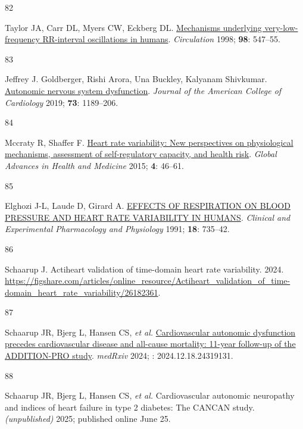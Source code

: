 \documentclass[
  letterpaper,
  headsepline=true,
  open=any]{scrbook}
\newlength{\cslhangindent}
\newlength{\csllabelwidth}
\newlength{\cslentryspacingunit} %
\newenvironment{CSLReferences}[2] %
 {%
  \setlength{\parindent}{0pt}
  \ifodd #1
  \let\oldpar\par
  \def\par{\hangindent=\cslhangindent\oldpar}
  \fi
  \setlength{\parskip}{#2\cslentryspacingunit}
 }%
 {}
\newcommand{\CSLLeftMargin}[1]{\parbox[t]{\csllabelwidth}{#1}}
\newcommand{\CSLRightInline}[1]{\parbox[t]{\linewidth - \csllabelwidth}{#1}\break}
\begin{document}
\begin{CSLReferences}{0}{0}
\leavevmode{}%
\CSLLeftMargin{82 }%
\CSLRightInline{Taylor JA, Carr DL, Myers CW, Eckberg DL.
\href{https://doi.org/10.1161/01.CIR.98.6.547}{Mechanisms underlying
very-low-frequency RR-interval oscillations in humans}.
\emph{Circulation} 1998; \textbf{98}: 547--55.}

\leavevmode{}%
\CSLLeftMargin{83 }%
\CSLRightInline{Jeffrey J. Goldberger, Rishi Arora, Una Buckley,
Kalyanam Shivkumar.
\href{https://doi.org/doi:10.1016/j.jacc.2018.12.064}{Autonomic nervous
system dysfunction}. \emph{Journal of the American College of
Cardiology} 2019; \textbf{73}: 1189--206.}

\leavevmode{}%
\CSLLeftMargin{84 }%
\CSLRightInline{Mccraty R, Shaffer F.
\href{https://doi.org/10.7453/gahmj.2014.073}{Heart rate variability:
New perspectives on physiological mechanisms, assessment of
self-regulatory capacity, and health risk}. \emph{Global Advances in
Health and Medicine} 2015; \textbf{4}: 46--61.}

\leavevmode{}%
\CSLLeftMargin{85 }%
\CSLRightInline{Elghozi J-L, Laude D, Girard A.
\href{https://doi.org/10.1111/j.1440-1681.1991.tb01391.x}{EFFECTS OF
RESPIRATION ON BLOOD PRESSURE AND HEART RATE VARIABILITY IN HUMANS}.
\emph{Clinical and Experimental Pharmacology and Physiology} 1991;
\textbf{18}: 735--42.}

\leavevmode{}%
\CSLLeftMargin{86 }%
\CSLRightInline{Schaarup J. Actiheart validation of time-domain heart
rate variability. 2024.
\url{https://figshare.com/articles/online_resource/Actiheart_validation_of_time-domain_heart_rate_variability/26182361}.}

\leavevmode{}%
\CSLLeftMargin{87 }%
\CSLRightInline{Schaarup JR, Bjerg L, Hansen CS, \emph{et al.}
\href{https://doi.org/10.1101/2024.12.18.24319131}{Cardiovascular
autonomic dysfunction precedes cardiovascular disease and all-cause
mortality: 11-year follow-up of the ADDITION-PRO study}. \emph{medRxiv}
2024; : 2024.12.18.24319131.}

\leavevmode{}%
\CSLLeftMargin{88 }%
\CSLRightInline{Schaarup JR, Bjerg L, Hansen CS, \emph{et al.}
Cardiovascular autonomic neuropathy and indices of heart failure in type
2 diabetes: The CANCAN study. \emph{(unpublished)} 2025; published
online June 25.}


\end{CSLReferences}
\end{document}
